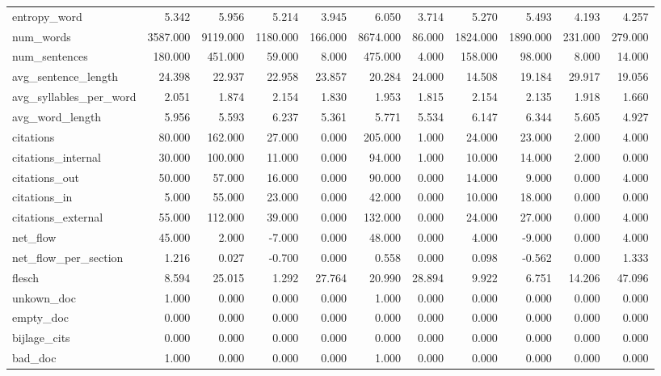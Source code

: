 \begin{tabular}{lrrrrrrrrrr}
\cline{1-11}
entropy\_word & 5.342 & 5.956 & 5.214 & 3.945 & 6.050 & 3.714 & 5.270 & 5.493 & 4.193 & 4.257 \\
\cline{1-11}
num\_words & 3587.000 & 9119.000 & 1180.000 & 166.000 & 8674.000 & 86.000 & 1824.000 & 1890.000 & 231.000 & 279.000 \\
\cline{1-11}
num\_sentences & 180.000 & 451.000 & 59.000 & 8.000 & 475.000 & 4.000 & 158.000 & 98.000 & 8.000 & 14.000 \\
\cline{1-11}
avg\_sentence\_length & 24.398 & 22.937 & 22.958 & 23.857 & 20.284 & 24.000 & 14.508 & 19.184 & 29.917 & 19.056 \\
\cline{1-11}
avg\_syllables\_per\_word & 2.051 & 1.874 & 2.154 & 1.830 & 1.953 & 1.815 & 2.154 & 2.135 & 1.918 & 1.660 \\
\cline{1-11}
avg\_word\_length & 5.956 & 5.593 & 6.237 & 5.361 & 5.771 & 5.534 & 6.147 & 6.344 & 5.605 & 4.927 \\
\cline{1-11}
citations & 80.000 & 162.000 & 27.000 & 0.000 & 205.000 & 1.000 & 24.000 & 23.000 & 2.000 & 4.000 \\
\cline{1-11}
citations\_internal & 30.000 & 100.000 & 11.000 & 0.000 & 94.000 & 1.000 & 10.000 & 14.000 & 2.000 & 0.000 \\
\cline{1-11}
citations\_out & 50.000 & 57.000 & 16.000 & 0.000 & 90.000 & 0.000 & 14.000 & 9.000 & 0.000 & 4.000 \\
\cline{1-11}
citations\_in & 5.000 & 55.000 & 23.000 & 0.000 & 42.000 & 0.000 & 10.000 & 18.000 & 0.000 & 0.000 \\
\cline{1-11}
citations\_external & 55.000 & 112.000 & 39.000 & 0.000 & 132.000 & 0.000 & 24.000 & 27.000 & 0.000 & 4.000 \\
\cline{1-11}
net\_flow & 45.000 & 2.000 & -7.000 & 0.000 & 48.000 & 0.000 & 4.000 & -9.000 & 0.000 & 4.000 \\
\cline{1-11}
net\_flow\_per\_section & 1.216 & 0.027 & -0.700 & 0.000 & 0.558 & 0.000 & 0.098 & -0.562 & 0.000 & 1.333 \\
\cline{1-11}
flesch & 8.594 & 25.015 & 1.292 & 27.764 & 20.990 & 28.894 & 9.922 & 6.751 & 14.206 & 47.096 \\
\cline{1-11}
unkown\_doc & 1.000 & 0.000 & 0.000 & 0.000 & 1.000 & 0.000 & 0.000 & 0.000 & 0.000 & 0.000 \\
\cline{1-11}
empty\_doc & 0.000 & 0.000 & 0.000 & 0.000 & 0.000 & 0.000 & 0.000 & 0.000 & 0.000 & 0.000 \\
\cline{1-11}
bijlage\_cits & 0.000 & 0.000 & 0.000 & 0.000 & 0.000 & 0.000 & 0.000 & 0.000 & 0.000 & 0.000 \\
\cline{1-11}
bad\_doc & 1.000 & 0.000 & 0.000 & 0.000 & 1.000 & 0.000 & 0.000 & 0.000 & 0.000 & 0.000 \\
\cline{1-11}
\bottomrule
\end{tabular}
